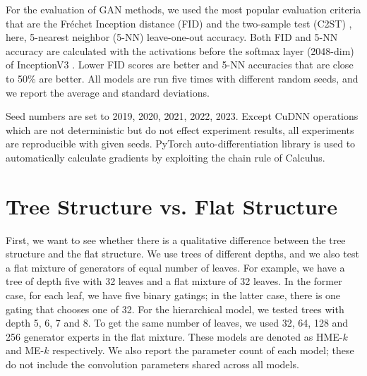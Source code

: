 \documentclass[a4paper,onesided,12pt]{report}
\begin{document}
For the evaluation of GAN methods, we used the most popular evaluation criteria that are the Fr\'echet Inception distance (FID) \cite{twotimes} and the two-sample test (C2ST) \cite{twosample}, here, 5-nearest neighbor (5-NN) leave-one-out accuracy. Both FID and 5-NN accuracy are calculated with the activations before the softmax layer (2048-dim) of InceptionV3 \cite{inceptionv3}. Lower FID scores are better and 5-NN accuracies that are close to 50\% are better. All models are run five times with different random seeds, and we report the average and standard deviations.

Seed numbers are set to {2019, 2020, 2021, 2022, 2023}. Except CuDNN \cite{chetlur2014cudnn} operations which are not deterministic but do not effect experiment results, all experiments are reproducible with given seeds. PyTorch auto-differentiation library \cite{paszke2017automatic} is used to automatically calculate gradients by exploiting the chain rule of Calculus. 

\section{Tree Structure vs. Flat Structure}
\label{sec:hme-vs-me}

First, we want to see whether there is a qualitative difference between the tree structure and the flat structure. We use trees of different depths, and we also test a flat mixture of generators of equal number of leaves. For example, we have a tree of depth five with 32 leaves and a flat mixture of 32 leaves. In the former case, for each leaf, we have five binary gatings; in the latter case, there is one gating that chooses one of 32. For the hierarchical model, we tested trees with depth 5, 6, 7 and 8. To get the same number of leaves, we used 32, 64, 128 and 256 generator experts in the flat mixture. These models are denoted as HME-$k$ and ME-$k$ respectively. We also report the parameter count of each model; these do not include the convolution parameters shared across all models.
\end{document}
